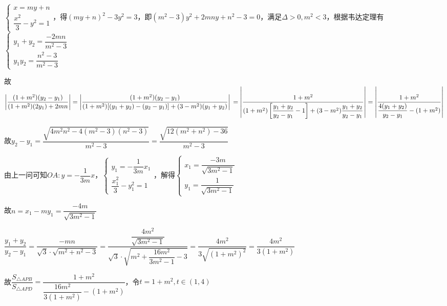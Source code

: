 \begin{enumerate}
\begin{enumerate}
\begin{jieda}
\begin{enumerate}
                
                $\left\{\begin{array}{l}
                    x = my+n\\
                    \dfrac{x^2}{3} - y^2 = 1
                \end{array}\right.$，得$(my+n)^2-3y^2 = 3$，即$(m^2-3)y^2+2mny+n^2-3 =0$，满足$\Delta > 0, m^2 < 3$，根据韦达定理有$\left\{\begin{array}{l}
                    y_1+y_2 = \dfrac{-2mn}{m^2-3} \\
                    y_1y_2 = \dfrac{n^2-3}{m^2-3}
                \end{array}\right.$

                故$\left|\dfrac{(1+m^2)(y_2-y_1)}{(1+m^2)(2y_1)+2mn}\right| = \left|\dfrac{(1+m^2)(y_2-y_1)}{(1+m^2)[(y_1+y_2)-(y_2-y_1)]+(3-m^2)(y_1+y_2)}\right| \\
                = \left|\dfrac{1+m^2}{(1+m^2)\left[\dfrac{y_1+y_2}{y_2-y_1}-1\right]+(3-m^2)\dfrac{y_1+y_2}{y_2-y_1}}\right| = \left|\dfrac{1+m^2}{\dfrac{4(y_1+y_2)}{y_2-y_1}-(1+m^2)}\right|$
                
                故$y_2-y_1 = \dfrac{\sqrt{4m^2n^2-4(m^2-3)(n^2-3)}}{m^2-3} = \dfrac{\sqrt{12(m^2+n^2)-36}}{m^2-3}$

                由上一问可知$OA: y = -\dfrac{1}{3m}x$，$\left\{\begin{array}{l}
                    y_1 = -\dfrac{1}{3m}x_1 \\
                    \dfrac{x_1^2}{3} - y_1^2 = 1
                \end{array}\right.$，解得$\left\{\begin{array}{l}
                    x_1 = \dfrac{-3m}{\sqrt{3m^2-1}}\\
                    y_1 = \dfrac{1}{\sqrt{3m^2-1}}
                \end{array}\right.$
                
                故$n = x_1-my_1 = \dfrac{-4m}{\sqrt{3m^2-1}}$
                
                $\dfrac{y_1+y_2}{y_2-y_1} = \dfrac{-mn}{\sqrt{3} \cdot \sqrt{m^2+n^2-3}} = \dfrac{\dfrac{4m^2}{\sqrt{3m^2-1}}}{\sqrt{3} \cdot \sqrt{m^2+\dfrac{16m^2}{3m^2-1}-3}} = \dfrac{4m^2}{3\sqrt{(1+m^2)^2}} = \dfrac{4m^2}{3(1+m^2)}$

                故$\dfrac{{S}_{\bigtriangleup {APB}}}{{S}_{\bigtriangleup {APD}}} = \dfrac{1+m^2}{\dfrac{16m^2}{3(1+m^2)}-(1+m^2)}$，令$t = 1+m^2, t \in (1, 4)$


\end{enumerate}
\end{jieda}
\end{enumerate}
\end{enumerate}
